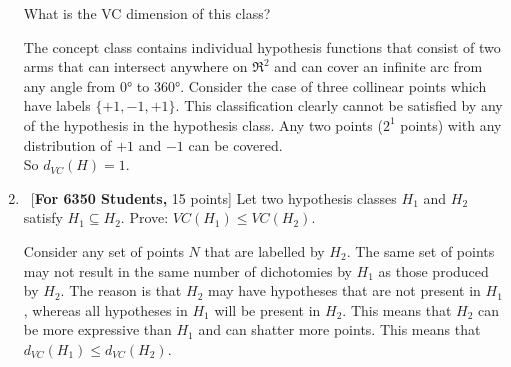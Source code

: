 \begin{enumerate}
  What is the VC dimension of this class?

The concept class contains individual hypothesis functions that consist of two arms that can intersect anywhere on $\Re^2$ and can cover an infinite arc from any angle from $0\si{\degree}$ to $360\si{\degree}$. Consider the case of three collinear points which have labels $\{+1, -1, +1\}$. This classification clearly cannot be satisfied by any of the hypothesis in the hypothesis class. Any two points ($2^1$ points) with any distribution of $+1$ and $-1$ can be covered.\\

So $d_{VC}(H) = 1$.

\item ~[{\bf For 6350 Students,} 15 points] Let two hypothesis classes
  $H_1$ and $H_2$ satisfy $H_1 \subseteq H_2$. Prove: $VC(H_1) \leq
  VC(H_2)$.

Consider any set of points $N$ that are labelled by $H_2$. The same set of points may not result in the same number of dichotomies by $H_1$ as those produced by $H_2$. The reason is that $H_2$ may have hypotheses that are not present in $H_1$, whereas all hypotheses in $H_1$ will be present in $H_2$. This means that $H_2$ can be more expressive than $H_1$ and can shatter more points. This means that $d_{VC}(H_1) \leq d_{VC}(H_2)$.

\end{enumerate}
